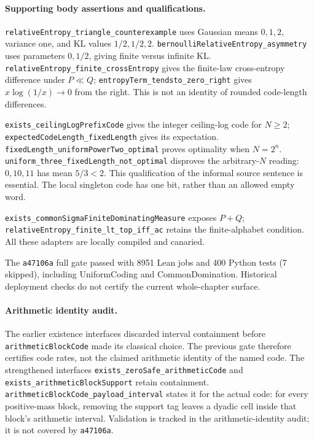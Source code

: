 \paragraph{Supporting body assertions and qualifications.}
\texttt{relativeEntropy\_triangle\_counterexample} uses Gaussian means
$0,1,2$, variance one, and KL values $1/2,1/2,2$.
\texttt{bernoulliRelativeEntropy\_asymmetry} uses parameters $0,1/2$,
giving finite versus infinite KL.
\texttt{relativeEntropy\_finite\_crossEntropy} gives the finite-law
cross-entropy difference under $P\ll Q$;
\texttt{entropyTerm\_tendsto\_zero\_right} gives $x\log(1/x)\to0$ from
the right. This is not an identity of rounded code-length differences.

\texttt{exists\_ceilingLogPrefixCode} gives the integer ceiling-log code
for $N\ge2$; \texttt{expectedCodeLength\_fixedLength} gives its expectation.
\texttt{fixedLength\_uniformPowerTwo\_optimal} proves optimality when
$N=2^n$. \texttt{uniform\_three\_fixedLength\_not\_optimal} disproves the
arbitrary-$N$ reading: $0,10,11$ has mean $5/3<2$. This qualification of the
informal source sentence is essential. The local singleton code has one bit,
rather than an allowed empty word.

\texttt{exists\_\allowbreak commonSigmaFiniteDominatingMeasure} exposes $P+Q$;
\texttt{relativeEntropy\_finite\_\allowbreak lt\_top\_iff\_ac} retains the finite-alphabet
condition. All these adapters are locally compiled and canaried.
\par
The \texttt{a47106a} full gate passed with 8951 Lean jobs and 400 Python tests
(7 skipped), including UniformCoding and CommonDomination. Historical
deployment checks do not certify the current whole-chapter surface.

\paragraph{Arithmetic identity audit.}
The earlier existence interfaces discarded interval containment before
\texttt{arithmeticBlockCode} made its classical choice. The previous gate
therefore certifies code rates, not the claimed arithmetic identity of the
named code. The strengthened interfaces
\texttt{exists\_zeroSafe\_arithmeticCode} and
\texttt{exists\_arithmeticBlockSupport} retain containment.
\texttt{arithmeticBlockCode\_payload\_interval} states it for the actual code:
for every positive-mass block, removing the support tag leaves a dyadic cell
inside that block's arithmetic interval. Validation is tracked in the
arithmetic-identity audit; it is not covered by \texttt{a47106a}.

